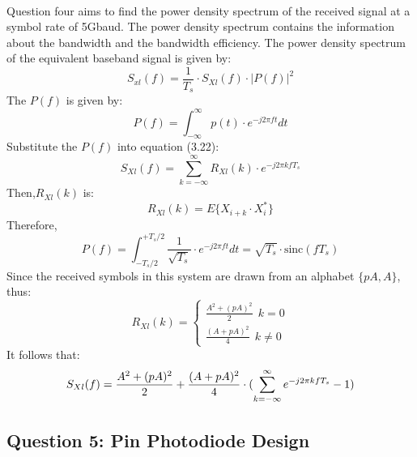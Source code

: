 \documentclass[12pt]{article}
\begin{document}
    \paragraph{}
    Question four aims to find the power density spectrum of the received signal at a symbol rate of 5Gbaud. The power density spectrum contains the information about the bandwidth and the bandwidth efficiency. The power density spectrum of the equivalent baseband signal is given by:
    \begin{equation}
        S_{xl}(f) = \frac{1}{T_s} \cdot S_{Xl}(f) \cdot |P(f)|^2
    \end{equation}
    The $P(f)$ is given by:
    \begin{equation}
        P(f) = \int_{-\infty}^\infty p(t)\cdot e^{-j2\pi f t}dt
    \end{equation}
    Substitute the $P(f)$ into equation (3.22):
    \begin{equation}
        S_{Xl}(f) = \sum_{k = -\infty}^\infty R_{Xl}(k) \cdot e^{-j2\pi k f T_s}
    \end{equation}
    Then,$R_{Xl}(k)$ is:
    \begin{equation}
         R_{Xl}(k) = E\{ X_{i+k} \cdot X_i^* \}
    \end{equation}
    Therefore,
    \begin{equation}
        P(f)=\int_{-T_s/2}^{+T_s/2} \frac{1}{\sqrt{T_s}}\cdot e^{-j2\pi f t}dt = \sqrt{T_s}\cdot \mbox{sinc} (f T_s)
    \end{equation}
    Since the received symbols in this system are drawn from an alphabet $\{pA, A\}$, thus:
    \begin{equation}
        R_{Xl} (k) = 
                \begin{cases}
                    \frac{A^2 + (pA)^{2}} {2}\ \ k = 0 \\
                    \frac{(A+pA)^2}{4} \ \ k \neq 0
                \end{cases}
    \end{equation}
    It follows that:
    \begin{align}
                S_{Xl}(f) &= \frac{A^2 + (pA)^{2}} {2} + \frac{(A+pA)^2}{4} \cdot (\sum_{k = -\infty}^\infty e^{-j2\pi kfT_s} - 1) \notag \\
            \end{align}
    
    \subsection{Question 5: Pin Photodiode Design}
\end{document}
